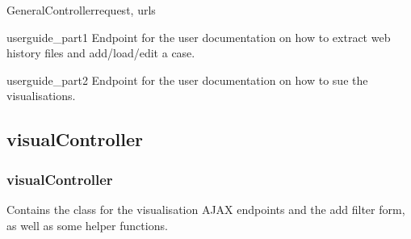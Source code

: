 \documentclass[letterpaper,10pt,english]{manual}
\begin{document}
\begin{classdesc}{GeneralController}{request, urls}
\hypertarget{webscavator.controllers.generalController.GeneralController.userguide_part1}{}\begin{methoddesc}{userguide\_part1}{}
Endpoint for the user documentation on how to extract web history files and add/load/edit a case.
\end{methoddesc}

\hypertarget{webscavator.controllers.generalController.GeneralController.userguide_part2}{}\begin{methoddesc}{userguide\_part2}{}
Endpoint for the user documentation on how to sue the visualisations.
\end{methoddesc}
\end{classdesc}

\resetcurrentobjects
\hypertarget{--doc-visualController}{}

\subsection{visualController}
\hypertarget{module-webscavator.controllers.visualController}{}
\modulesynopsis{}

\subsubsection{visualController}

Contains the class for the visualisation AJAX endpoints and the add filter form, as 
well as some helper functions.
\end{document}
